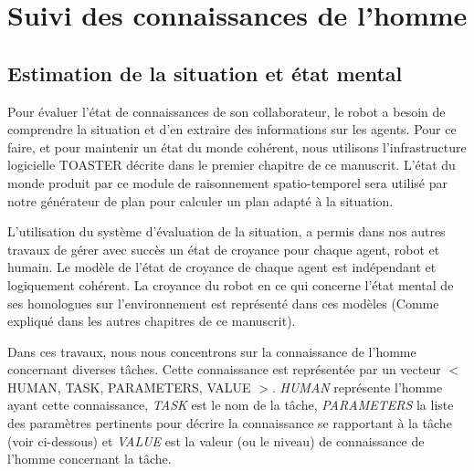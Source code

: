 \documentclass[a4paper,11pt,twoside]{StyleThese}
\begin{document}
\section{Suivi des connaissances de l'homme}

\subsection{Estimation de la situation et état mental}

Pour évaluer l'état de connaissances de son collaborateur, le robot a besoin de comprendre la situation et d'en extraire des informations sur les agents.
Pour ce faire, et pour maintenir un état du monde cohérent, nous utilisons l'infrastructure logicielle TOASTER décrite dans le premier chapitre de ce manuscrit. L'état du monde produit par ce module de raisonnement spatio-temporel sera utilisé par notre générateur de plan pour calculer un plan adapté à la situation.



L'utilisation du système d'évaluation de la situation, a permis dans nos autres travaux de gérer avec succès un état de croyance pour chaque agent, robot et humain. Le modèle de l'état de croyance de chaque agent est indépendant et logiquement cohérent. La croyance du robot en ce qui concerne l'état mental de ses homologues sur l'environnement est représenté dans ces modèles (Comme expliqué dans les autres chapitres de ce manuscrit).

Dans ces travaux, nous nous concentrons sur la connaissance de l'homme concernant diverses tâches. Cette connaissance est représentée par un vecteur $<$ HUMAN, TASK, PARAMETERS, VALUE $> $.
\textit{HUMAN} représente l'homme ayant cette connaissance, \textit{TASK} est le nom de la tâche, \textit{PARAMETERS} la liste des paramètres pertinents pour décrire la connaissance se rapportant à la tâche (voir ci-dessous) et \textit{VALUE} est la valeur (ou le niveau) de connaissance de l'homme concernant la tâche.
\end{document}
